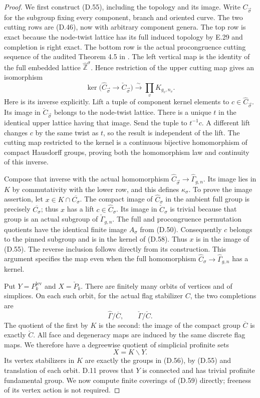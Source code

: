 \begin{proof}
We first construct (D.55), including the topology and its
image.  Write $C_{\vec\sigma}$ for the subgroup fixing
every component, branch and oriented curve.  The two
cutting rows are (D.46), now with arbitrary component
genera.  The top row is exact because the node-twist
lattice has its full induced topology by E.29 and
completion is right exact.  The bottom row is the
actual procongruence cutting sequence of the audited
Theorem 4.5 in \cite{ET_Boggi2014}.  The left vertical
map is the identity of the full embedded lattice
$\widehat{\mathbb Z}^{\sigma}$.  Hence restriction of
the upper cutting map gives an isomorphism
\[
 \ker\bigl(\widehat C_{\vec\sigma}
                         \longrightarrow\check C_{\vec\sigma}\bigr)
          \xrightarrow{\sim}\prod_v K_{g_v,n_v}.             \tag{D.58}
\]
Here is its inverse explicitly.  Lift a tuple of component
kernel elements to $c\in\widehat C_{\vec\sigma}$.  Its
image in $\check C_{\vec\sigma}$ belongs to the node-twist
lattice.  There is a unique $t$ in the identical upper
lattice having that image.  Send the tuple to $t^{-1}c$.
A different lift changes $c$ by the same twist as $t$,
so the result is independent of the lift.  The cutting
map restricted to the kernel is a continuous bijective
homomorphism of compact Hausdorff groups, proving both
the homomorphism law and continuity of this inverse.

Compose that inverse with the actual homomorphism
$\widehat C_{\vec\sigma}\to\widehat\Gamma_{g,n}$.
Its image lies in $K$ by commutativity with the lower
row, and this defines $\kappa_\sigma$.  To prove the
image assertion, let $x\in K\cap\overline{C_\sigma}$.
The compact image of $\widehat C_\sigma$ in the ambient
full group is precisely $\overline{C_\sigma}$; thus $x$
has a lift $c\in\widehat C_\sigma$.  Its image in
$\check C_\sigma$ is trivial because that group is an
actual subgroup of $\check\Gamma_{g,n}$.  The full and
procongruence permutation quotients have the identical
finite image $A_\sigma$ from (D.50).  Consequently $c$
belongs to the pinned subgroup and is in the kernel
of (D.58).  Thus $x$ is in the image of (D.55).
The reverse inclusion follows directly from its
construction.  This argument specifies the map even
when the full homomorphism
$\widehat C_\sigma\to\widehat\Gamma_{g,n}$ has a kernel.

Put $Y=P_k^{\mathrm{lev}}$ and $X=\check P_k$.
There are finitely many orbits of vertices and of
simplices.  On each such orbit, for the actual flag
stabilizer $C$, the two completions are
\[
        \widehat\Gamma/\overline C,
              \qquad \check\Gamma/\check C.
\]
The quotient of the first by $K$ is the second:
the image of the compact group $\overline C$ is
exactly $\check C$.  All face and degeneracy maps
are induced by the same discrete flag maps.  We
therefore have a degreewise quotient of simplicial
profinite sets
\[
                         X=K\backslash Y.                  \tag{D.59}
\]
Its vertex stabilizers in $K$ are exactly the groups
in (D.56), by (D.55) and translation of each orbit.
D.11 proves that $Y$ is connected and has trivial
profinite fundamental group.  We now compute finite
coverings of (D.59) directly; freeness of its vertex
action is not required.


\end{proof}
